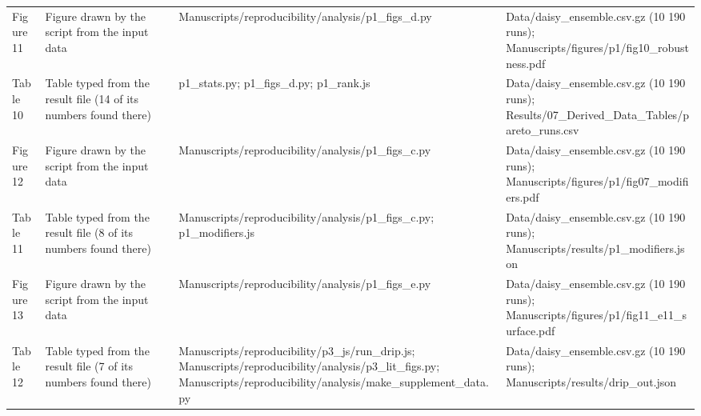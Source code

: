 {\begin{longtable}{p{}p{}p{}p{}}
{}Figure 11 & Figure drawn by the script from the input data & Manuscripts/\allowbreak{}reproducibility/\allowbreak{}analysis/\allowbreak{}p1\_\allowbreak{}figs\_\allowbreak{}d.py & Data/\allowbreak{}daisy\_\allowbreak{}ensemble.csv.gz (10 190 runs);  Manuscripts/\allowbreak{}figures/\allowbreak{}p1/\allowbreak{}fig10\_\allowbreak{}robustness.pdf\\
{}Table 10 & Table typed from the result file (14 of its numbers found there) & p1\_\allowbreak{}stats.py;  p1\_\allowbreak{}figs\_\allowbreak{}d.py;  p1\_\allowbreak{}rank.js & Data/\allowbreak{}daisy\_\allowbreak{}ensemble.csv.gz (10 190 runs);  Results/\allowbreak{}07\_\allowbreak{}Derived\_\allowbreak{}Data\_\allowbreak{}Tables/\allowbreak{}pareto\_\allowbreak{}runs.csv\\
{}Figure 12 & Figure drawn by the script from the input data & Manuscripts/\allowbreak{}reproducibility/\allowbreak{}analysis/\allowbreak{}p1\_\allowbreak{}figs\_\allowbreak{}c.py & Data/\allowbreak{}daisy\_\allowbreak{}ensemble.csv.gz (10 190 runs);  Manuscripts/\allowbreak{}figures/\allowbreak{}p1/\allowbreak{}fig07\_\allowbreak{}modifiers.pdf\\
{}Table 11 & Table typed from the result file (8 of its numbers found there) & Manuscripts/\allowbreak{}reproducibility/\allowbreak{}analysis/\allowbreak{}p1\_\allowbreak{}figs\_\allowbreak{}c.py;  p1\_\allowbreak{}modifiers.js & Data/\allowbreak{}daisy\_\allowbreak{}ensemble.csv.gz (10 190 runs);  Manuscripts/\allowbreak{}results/\allowbreak{}p1\_\allowbreak{}modifiers.json\\
{}Figure 13 & Figure drawn by the script from the input data & Manuscripts/\allowbreak{}reproducibility/\allowbreak{}analysis/\allowbreak{}p1\_\allowbreak{}figs\_\allowbreak{}e.py & Data/\allowbreak{}daisy\_\allowbreak{}ensemble.csv.gz (10 190 runs);  Manuscripts/\allowbreak{}figures/\allowbreak{}p1/\allowbreak{}fig11\_\allowbreak{}e11\_\allowbreak{}surface.pdf\\
{}Table 12 & Table typed from the result file (7 of its numbers found there) & Manuscripts/\allowbreak{}reproducibility/\allowbreak{}p3\_\allowbreak{}js/\allowbreak{}run\_\allowbreak{}drip.js;  Manuscripts/\allowbreak{}reproducibility/\allowbreak{}analysis/\allowbreak{}p3\_\allowbreak{}lit\_\allowbreak{}figs.py;  Manuscripts/\allowbreak{}reproducibility/\allowbreak{}analysis/\allowbreak{}make\_\allowbreak{}supplement\_\allowbreak{}data.py & Data/\allowbreak{}daisy\_\allowbreak{}ensemble.csv.gz (10 190 runs);  Manuscripts/\allowbreak{}results/\allowbreak{}drip\_\allowbreak{}out.json\\

\end{longtable}}
